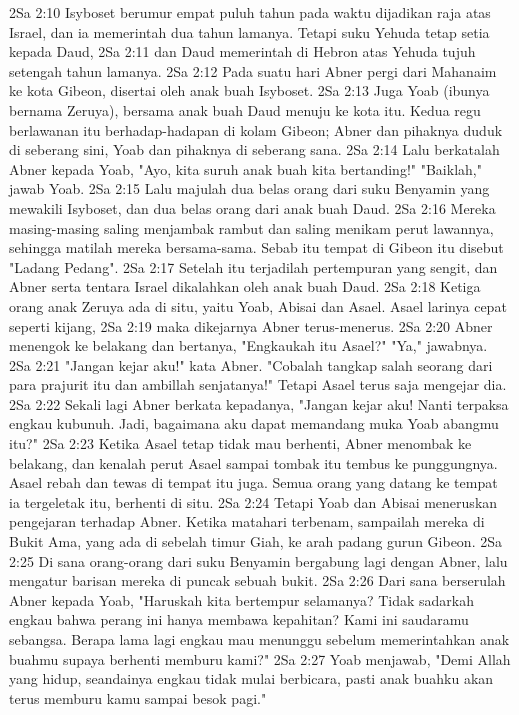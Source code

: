 2Sa 2:10  Isyboset berumur empat puluh tahun pada waktu dijadikan raja atas Israel, dan ia memerintah dua tahun lamanya. Tetapi suku Yehuda tetap setia kepada Daud,
2Sa 2:11  dan Daud memerintah di Hebron atas Yehuda tujuh setengah tahun lamanya.
2Sa 2:12  Pada suatu hari Abner pergi dari Mahanaim ke kota Gibeon, disertai oleh anak buah Isyboset.
2Sa 2:13  Juga Yoab (ibunya bernama Zeruya), bersama anak buah Daud menuju ke kota itu. Kedua regu berlawanan itu berhadap-hadapan di kolam Gibeon; Abner dan pihaknya duduk di seberang sini, Yoab dan pihaknya di seberang sana.
2Sa 2:14  Lalu berkatalah Abner kepada Yoab, "Ayo, kita suruh anak buah kita bertanding!" "Baiklah," jawab Yoab.
2Sa 2:15  Lalu majulah dua belas orang dari suku Benyamin yang mewakili Isyboset, dan dua belas orang dari anak buah Daud.
2Sa 2:16  Mereka masing-masing saling menjambak rambut dan saling menikam perut lawannya, sehingga matilah mereka bersama-sama. Sebab itu tempat di Gibeon itu disebut "Ladang Pedang".
2Sa 2:17  Setelah itu terjadilah pertempuran yang sengit, dan Abner serta tentara Israel dikalahkan oleh anak buah Daud.
2Sa 2:18  Ketiga orang anak Zeruya ada di situ, yaitu Yoab, Abisai dan Asael. Asael larinya cepat seperti kijang,
2Sa 2:19  maka dikejarnya Abner terus-menerus.
2Sa 2:20  Abner menengok ke belakang dan bertanya, "Engkaukah itu Asael?" "Ya," jawabnya.
2Sa 2:21  "Jangan kejar aku!" kata Abner. "Cobalah tangkap salah seorang dari para prajurit itu dan ambillah senjatanya!" Tetapi Asael terus saja mengejar dia.
2Sa 2:22  Sekali lagi Abner berkata kepadanya, "Jangan kejar aku! Nanti terpaksa engkau kubunuh. Jadi, bagaimana aku dapat memandang muka Yoab abangmu itu?"
2Sa 2:23  Ketika Asael tetap tidak mau berhenti, Abner menombak ke belakang, dan kenalah perut Asael sampai tombak itu tembus ke punggungnya. Asael rebah dan tewas di tempat itu juga. Semua orang yang datang ke tempat ia tergeletak itu, berhenti di situ.
2Sa 2:24  Tetapi Yoab dan Abisai meneruskan pengejaran terhadap Abner. Ketika matahari terbenam, sampailah mereka di Bukit Ama, yang ada di sebelah timur Giah, ke arah padang gurun Gibeon.
2Sa 2:25  Di sana orang-orang dari suku Benyamin bergabung lagi dengan Abner, lalu mengatur barisan mereka di puncak sebuah bukit.
2Sa 2:26  Dari sana berserulah Abner kepada Yoab, "Haruskah kita bertempur selamanya? Tidak sadarkah engkau bahwa perang ini hanya membawa kepahitan? Kami ini saudaramu sebangsa. Berapa lama lagi engkau mau menunggu sebelum memerintahkan anak buahmu supaya berhenti memburu kami?"
2Sa 2:27  Yoab menjawab, "Demi Allah yang hidup, seandainya engkau tidak mulai berbicara, pasti anak buahku akan terus memburu kamu sampai besok pagi."
